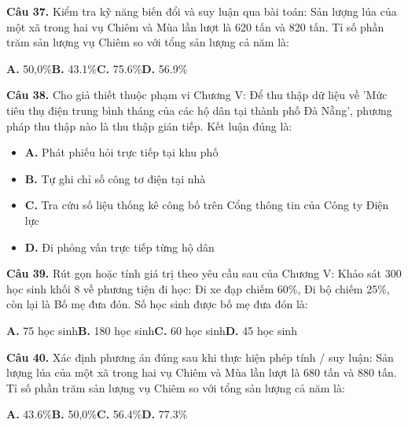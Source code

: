 \documentclass[11pt,a4paper]{article}
\begin{document}
\textbf{\color{primary} Câu 37.} Kiểm tra kỹ năng biến đổi và suy luận qua bài toán: Sản lượng lúa của một xã trong hai vụ Chiêm và Mùa lần lượt là 620 tấn và 820 tấn. Tỉ số phần trăm sản lượng vụ Chiêm so với tổng sản lượng cả năm là:\par
\hspace*{1.5em}\textbf{A.} 50,0\%\quad\quad \textbf{B.} 43.1\%\quad\quad \textbf{C.} 75.6\%\quad\quad \textbf{D.} 56.9\%\par\vspace{2pt}
\textbf{\color{primary} Câu 38.} Cho giả thiết thuộc phạm vi Chương V: Để thu thập dữ liệu về 'Mức tiêu thụ điện trung bình tháng của các hộ dân tại thành phố Đà Nẵng', phương pháp thu thập nào là thu thập gián tiếp. Kết luận đúng là:\par
\begin{itemize}\setlength{\itemsep}{1pt}\setlength{\parskip}{0pt}
  \item[] \textbf{A.} Phát phiếu hỏi trực tiếp tại khu phố
  \item[] \textbf{B.} Tự ghi chỉ số công tơ điện tại nhà
  \item[] \textbf{C.} Tra cứu số liệu thống kê công bố trên Cổng thông tin của Công ty Điện lực
  \item[] \textbf{D.} Đi phỏng vấn trực tiếp từng hộ dân
\end{itemize}\vspace{2pt}
\textbf{\color{primary} Câu 39.} Rút gọn hoặc tính giá trị theo yêu cầu sau của Chương V: Khảo sát 300 học sinh khối 8 về phương tiện đi học: Đi xe đạp chiếm 60\%, Đi bộ chiếm 25\%, còn lại là Bố mẹ đưa đón. Số học sinh được bố mẹ đưa đón là:\par
\hspace*{1.5em}\textbf{A.} 75 học sinh\quad\quad \textbf{B.} 180 học sinh\quad\quad \textbf{C.} 60 học sinh\quad\quad \textbf{D.} 45 học sinh\par\vspace{2pt}
\textbf{\color{primary} Câu 40.} Xác định phương án đúng sau khi thực hiện phép tính / suy luận: Sản lượng lúa của một xã trong hai vụ Chiêm và Mùa lần lượt là 680 tấn và 880 tấn. Tỉ số phần trăm sản lượng vụ Chiêm so với tổng sản lượng cả năm là:\par
\hspace*{1.5em}\textbf{A.} 43.6\%\quad\quad \textbf{B.} 50,0\%\quad\quad \textbf{C.} 56.4\%\quad\quad \textbf{D.} 77.3\%\par\vspace{2pt}
\end{document}
